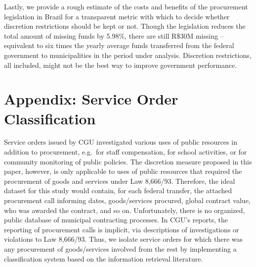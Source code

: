 \documentclass[11pt]{article}
\begin{document}
Lastly, we provide a rough estimate of the costs and benefits of the procurement legislation in Brazil for a transparent metric with which to decide whether discretion restrictions should be kept or not. Though the legislation reduces the total amount of missing funds by 5.98\%, there are still R\$30M missing -- equivalent to six times the yearly average funds transferred from the federal government to municipalities in the period under analysis. Discretion restrictions, all included, might not be the best way to improve government performance.

\clearpage

\setlength\bibsep{0pt}



\clearpage







\clearpage

\appendix

\section{Appendix: Service Order Classification} \label{sec:appendixA}

Service orders issued by CGU investigated various uses of public resources in addition to procurement, e.g.~for staff compensation, for school activities, or for community monitoring of public policies. The discretion measure proposed in this paper, however, is only applicable to uses of public resources that required the procurement of goods and services under Law 8,666/93. Therefore, the ideal dataset for this study would contain, for each federal transfer, the attached procurement call informing dates, goods/services procured, global contract value, who was awarded the contract, and so on. Unfortunately, there is no organized, public database of municipal contracting processes. In CGU's reports, the reporting of procurement calls is implicit, via descriptions of investigations or violations to Law 8,666/93. Thus, we isolate service orders for which there was any procurement of goods/services involved from the rest by implementing a classification system based on the information retrieval literature.
\end{document}
